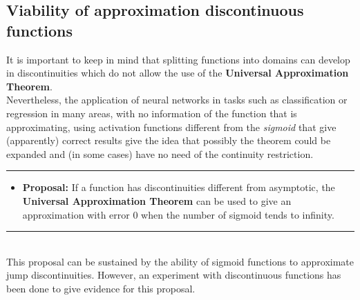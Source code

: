 \documentclass[a4paper, 11pt]{article}
\begin{document}
\subsection{Viability of approximation discontinuous functions}
It is important to keep in mind that splitting functions into domains can develop in discontinuities which do not allow the use of the \textbf{Universal Approximation Theorem}.\\
Nevertheless, the application of neural networks in tasks such as classification or regression in many areas, with no information of the function that is approximating, using activation functions different from the \textit{sigmoid} that give (apparently) correct results give the idea that possibly the theorem could be expanded and (in some cases) have no need of the continuity restriction.\\
\rule{\linewidth}{0.4pt}
\begin{itemize}
    \item \textbf{Proposal:} If a function has discontinuities different from asymptotic, the \textbf{Universal Approximation Theorem} can be used to give an approximation with error 0 when the number of sigmoid tends to infinity.
\end{itemize}
\rule{\linewidth}{0.4pt}\\ \vspace{0.5em}
This proposal can be sustained by the ability of sigmoid functions to approximate jump discontinuities. However, an experiment with discontinuous functions has been done to give evidence for this proposal.
\end{document}

